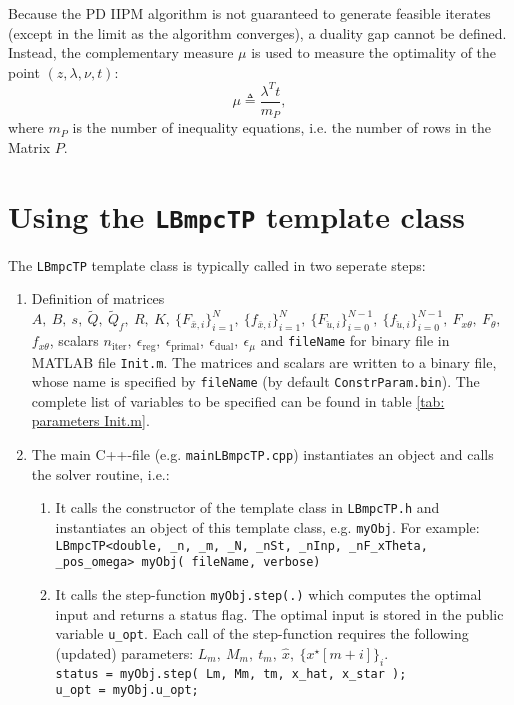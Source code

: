 \documentclass[letter]{article}
\begin{document}
\begin{sffamily}
\noindent
Because the PD IIPM algorithm is not guaranteed to generate feasible iterates (except in the limit as the algorithm converges), a duality gap cannot be defined. Instead, the complementary measure $\mu$ is used to measure the optimality of the point $(z,\lambda,\nu,t)$:
\begin{equation}
\label{eq: dualityGap}
	\mu\triangleq \frac{\lambda^T t}{m_P},
\end{equation}
where $m_P$ is the number of inequality equations, i.e. the number of rows in the Matrix $P$.

\section{Using the \texttt{LBmpcTP} template class}
The \texttt{LBmpcTP} template class is typically called in two seperate steps:

\begin{enumerate}
	\item Definition of matrices $A,\ B,\ s,\ \tilde{Q},\ \tilde{Q}_f,\ R,\ K,\ \{F_{\bar{x},i}\}_{i=1}^N,\ \{f_{\bar{x},i}\}_{i=1}^N,\ \{F_{\check{u},i}\}_{i=0}^{N-1},\ \{f_{\check{u},i}\}_{i=0}^{N-1},\ F_{x\theta},\ F_\theta,$ $f_{x\theta}$, scalars $n_\text{iter},\ \epsilon_\text{reg},\ \epsilon_\text{primal},\ \epsilon_\text{dual},\ \epsilon_\mu$ and \texttt{fileName} for binary file in MATLAB file \texttt{Init.m}. The matrices and scalars are written to a binary file, whose name is specified by \texttt{fileName} (by default \texttt{ConstrParam.bin}). The complete list of variables to be specified can be found in table \ref{tab: parameters Init.m}.
	\item The main C++-file (e.g. \texttt{mainLBmpcTP.cpp}) instantiates an object and calls the solver routine, i.e.:
	\begin{enumerate}
		\item It calls the constructor of the template class in \texttt{LBmpcTP.h} and instantiates an object of this template class, e.g. \texttt{myObj}. For example: \\
		\texttt{LBmpcTP<double, \_n, \_m, \_N, \_nSt, \_nInp, \_nF\_xTheta, \_pos\_omega> myObj( fileName, verbose)}
		\item It calls the step-function \texttt{myObj.step(.)} which computes the optimal input and returns a status flag. The optimal input is stored in the public variable \texttt{u\_opt}. Each call of the step-function requires the following (updated) parameters: $L_m,\ M_m,\ t_m,\ \hat{x},\ \{x^\star[m+i]\}_i$. \\
		\texttt{status = myObj.step( Lm, Mm, tm, x\_hat, x\_star );}\\
		\texttt{u\_opt = myObj.u\_opt;}
	\end{enumerate}
\end{enumerate}


\end{sffamily}
\end{document}
